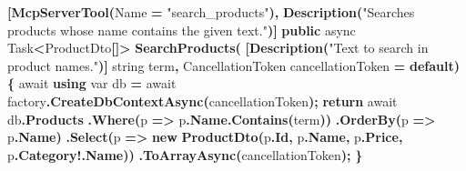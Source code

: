 \documentclass[
  italian,
  10pt,
]{book}
\newenvironment{Shaded}{\begin{snugshade}}{\end{snugshade}}
\newcommand{\DataTypeTok}[1]{\textcolor[rgb]{0.13,0.29,0.53}{#1}}
\newcommand{\FunctionTok}[1]{\textcolor[rgb]{0.13,0.29,0.53}{\textbf{#1}}}
\newcommand{\KeywordTok}[1]{\textcolor[rgb]{0.13,0.29,0.53}{\textbf{#1}}}
\newcommand{\NormalTok}[1]{#1}
\newcommand{\OperatorTok}[1]{\textcolor[rgb]{0.81,0.36,0.00}{\textbf{#1}}}
\newcommand{\StringTok}[1]{\textcolor[rgb]{0.31,0.60,0.02}{#1}}
\begin{document}
\begin{Shaded}
\begin{Highlighting}[]
    \OperatorTok{[}\FunctionTok{McpServerTool}\OperatorTok{(}\NormalTok{Name }\OperatorTok{=} \StringTok{"search\_products"}\OperatorTok{),} \FunctionTok{Description}\OperatorTok{(}\StringTok{"Searches products whose name contains the given text."}\OperatorTok{)]}
    \KeywordTok{public}\NormalTok{ async Task}\OperatorTok{\textless{}}\NormalTok{ProductDto}\OperatorTok{[]\textgreater{}} \FunctionTok{SearchProducts}\OperatorTok{(}
        \OperatorTok{[}\FunctionTok{Description}\OperatorTok{(}\StringTok{"Text to search in product names."}\OperatorTok{)]} \DataTypeTok{string}\NormalTok{ term}\OperatorTok{,}
\NormalTok{        CancellationToken cancellationToken }\OperatorTok{=} \KeywordTok{default}\OperatorTok{)}
    \OperatorTok{\{}
\NormalTok{        await }\KeywordTok{using} \DataTypeTok{var}\NormalTok{ db }\OperatorTok{=}\NormalTok{ await factory}\OperatorTok{.}\FunctionTok{CreateDbContextAsync}\OperatorTok{(}\NormalTok{cancellationToken}\OperatorTok{);}
        \KeywordTok{return}\NormalTok{ await db}\OperatorTok{.}\FunctionTok{Products}
            \OperatorTok{.}\FunctionTok{Where}\OperatorTok{(}\NormalTok{p }\OperatorTok{=\textgreater{}}\NormalTok{ p}\OperatorTok{.}\FunctionTok{Name}\OperatorTok{.}\FunctionTok{Contains}\OperatorTok{(}\NormalTok{term}\OperatorTok{))}
            \OperatorTok{.}\FunctionTok{OrderBy}\OperatorTok{(}\NormalTok{p }\OperatorTok{=\textgreater{}}\NormalTok{ p}\OperatorTok{.}\FunctionTok{Name}\OperatorTok{)}
            \OperatorTok{.}\FunctionTok{Select}\OperatorTok{(}\NormalTok{p }\OperatorTok{=\textgreater{}} \KeywordTok{new} \FunctionTok{ProductDto}\OperatorTok{(}\NormalTok{p}\OperatorTok{.}\FunctionTok{Id}\OperatorTok{,}\NormalTok{ p}\OperatorTok{.}\FunctionTok{Name}\OperatorTok{,}\NormalTok{ p}\OperatorTok{.}\FunctionTok{Price}\OperatorTok{,}\NormalTok{ p}\OperatorTok{.}\FunctionTok{Category}\OperatorTok{!.}\FunctionTok{Name}\OperatorTok{))}
            \OperatorTok{.}\FunctionTok{ToArrayAsync}\OperatorTok{(}\NormalTok{cancellationToken}\OperatorTok{);}
    \OperatorTok{\}}


\end{Highlighting}
\end{Shaded}
\end{document}
